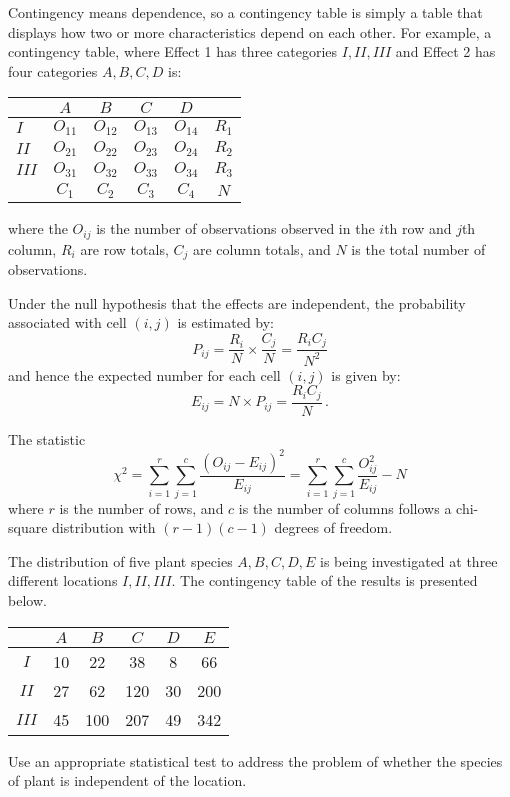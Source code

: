 \documentclass[12pt]{article}
\newenvironment{example}[1][Example:]{\begin{trivlist}
\item[\hskip \labelsep {\bfseries #1}]}{\end{trivlist}}
\begin{document}
Contingency means dependence, so a contingency table is simply a table that displays how two or more characteristics depend on each other.  For example, a contingency table, where Effect 1 has three categories $I, II, III$ and Effect 2 has four categories $A, B, C, D$ is:
\begin{center}
\begin{tabular}{|l|c|c|c|c|c|}
  \hline
   & $A$ & $B$ & $C$ & $D$ &  \\ \hline
  $I$ & $O_{11}$ & $O_{12}$ & $O_{13}$ & $O_{14}$ & $R_{1}$ \\
  $II$ & $O_{21}$ & $O_{22}$ & $O_{23}$ & $O_{24}$ & $R_{2}$ \\
  $III$ & $O_{31}$ & $O_{32}$ & $O_{33}$ & $O_{34}$& $R_{3}$ \\ \hline
   & $C_{1}$ & $C_{2}$ & $C_{3}$ & $C_{4}$ & $N$ \\
  \hline
\end{tabular}
\end{center}
where the $O_{ij}$ is the number of observations observed in the $i$th row and $j$th column, $R_{i}$ are row totals, $C_{j}$ are column totals, and $N$ is the total number of observations.

Under the null hypothesis that the effects are independent, the probability associated with cell $(i,j)$ is estimated by:
$$
P_{ij}=\frac{R_{i}}{N}\times\frac{C_{j}}{N}=\frac{R_{i}C_{j}}{N^{2}}
$$
and hence the expected number for each cell $(i,j)$ is given by:
$$
E_{ij}=N \times P_{ij}=\frac{R_{i}C_{j}}{N} \,.
$$

The statistic
$$
\chi^{2}=\sum_{i=1}^{r}\sum_{j=1}^{c}\frac{(O_{ij}-E_{ij})^{2}}{E_{ij}}=\sum_{i=1}^{r}\sum_{j=1}^{c}\frac{O_{ij}^{2}}{E_{ij}}-N
$$
where $r$ is the number of rows, and $c$ is the number of columns follows a chi-square distribution with $(r-1)(c-1)$ degrees of freedom.

\begin{example}
The distribution of five plant species $A, B, C, D, E$ is being investigated at three different locations $I, II, III$. The contingency table of the results is presented below.
\begin{center}
\begin{tabular}{|c|c|c|c|c|c|}
               \hline
                & $A$ & $B$ & $C$ & $D$ & $E$ \\ \hline
               $I$ & 10 & 22 & 38 & 8 & 66 \\
               $II$ & 27 & 62 & 120 & 30 & 200 \\
               $III$ & 45 & 100 & 207 & 49 & 342 \\
               \hline
\end{tabular}
\end{center}
Use an appropriate statistical test to address the problem of whether the species of plant is independent of the location.
\end{example}
\end{document}

